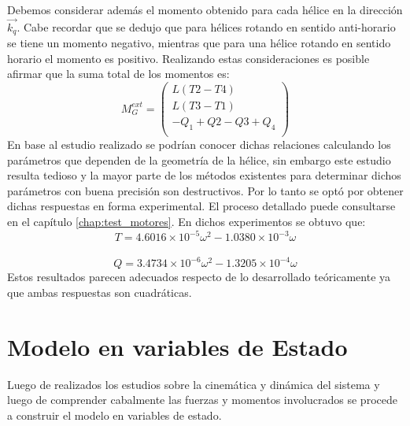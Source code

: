 \documentclass[main]{subfiles}
\begin{document}
Debemos considerar adem\'as el momento obtenido para cada h\'elice en la direcci\'on $\vec{k_q}$. Cabe recordar que se dedujo que para h\'elices rotando en sentido anti-horario se tiene un momento negativo, mientras que para una h\'elice rotando en sentido horario el momento es positivo. Realizando estas consideraciones es posible afirmar que la suma total de los momentos es:
\begin{equation}
M_G^{ext} = \left(\begin{array}{c}
L(T2-T4)\\
L(T3-T1)\\
-Q_1+Q2-Q3+Q_4\\
\end{array} \right)
\end{equation}
En base al estudio realizado se podr\'ian conocer dichas relaciones calculando los par\'ametros que dependen de la geometr\'ia de la h\'elice, sin embargo este estudio resulta tedioso y la mayor parte de los m\'etodos existentes para determinar dichos par\'ametros con buena precisi\'on son destructivos. Por lo tanto se opt\'o por obtener dichas respuestas en forma experimental. El proceso detallado puede consultarse en el cap\'itulo \ref{chap:test_motores}. En dichos experimentos se obtuvo que:
\begin{equation}
T=4.6016\times 10^{-5}\omega^2-1.0380\times 10^{-3}\omega
\end{equation}\\
\begin{equation}
Q= 3.4734\times 10^{-6}\omega^2-1.3205\times 10^{-4}\omega 
\end{equation}
Estos resultados parecen adecuados respecto de lo desarrollado te\'oricamente ya que ambas respuestas son cuadr\'aticas. 

\section{Modelo en variables de Estado}

Luego de realizados los estudios sobre la cinem\'atica y din\'amica del sistema y luego de comprender cabalmente las fuerzas y momentos involucrados se procede a construir el modelo en variables de estado.\\ 
\end{document}
